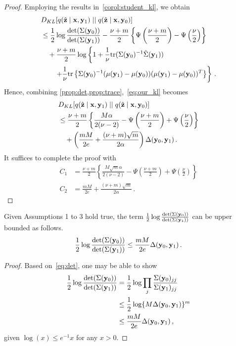 {\begin{proof}
Employing the results in~\cref{corol:student_kl}, we obtain 
\begin{align}
&D_{KL}[ q(\hat{\mathbf{z}} \mid \mathbf{x}, \mathbf{y}_1) \mid\mid q(\hat{\mathbf{z}} \mid \mathbf{x}, \mathbf{y}_0)] \notag \\
&\le \frac 1 2 \log \frac{\mathrm{det}(\Sigma(\mathbf{y}_0))}{\mathrm{det}(\Sigma(\mathbf{y}_1))} - \frac{\nu + m}{2}\left\{\Psi\left( \frac{\nu + m}{2} \right) - \Psi\left(\frac{\nu}{2} \right ) \right\} \notag \\
&\quad + \frac {\nu + m} 2 \log \left\{ 1 + \frac{1}{\nu} \mathrm{tr}(\Sigma(\mathbf{y}_0)^{-1} \tilde{\Sigma}(\mathbf{y}_1))  \right. \notag \\
&\qquad \left. + \frac{1}{\nu} \mathrm{tr}\left\{\Sigma(\mathbf{y}_0)^{-1} (\mu(\mathbf{y}_1) - \mu(\mathbf{y}_0))(\mu(\mathbf{y}_1) - \mu(\mathbf{y}_0))^T \right\} \right\} \label{eq:our_kl} \,.
\end{align}
Hence, combining \cref{prop:det,prop:trace},~\cref{eq:our_kl} becomes
\begin{align}
&D_{KL}[ q(\hat{\mathbf{z}} \mid \mathbf{x}, \mathbf{y}_1) \mid\mid q(\hat{\mathbf{z}} \mid \mathbf{x}, \mathbf{y}_0)] \notag \\
&\le \frac{\nu+m}{2} \left\{ \frac{M \alpha}{2(\nu-2)}  - \Psi\left( \frac{\nu + m}{2} \right) + \Psi\left(\frac{\nu}{2} \right) \right\} \notag \\
&\quad + \left( \frac{m M}{2e} + \frac{(\nu+m) \sqrt{m}}{2\alpha}  \right) \Delta(\mathbf{y}_0, \mathbf{y}_1) \,.
\end{align}
It suffices to complete the proof with 
\begin{align*}
C_1 &= \frac{\nu+m}{2} \left\{ \frac{M \sqrt{m} \alpha}{2(\nu-2)}  - \Psi\left( \frac{\nu + m}{2} \right) + \Psi\left(\frac{\nu}{2} \right) \right\} \\
C_2 &= \frac{m M}{2e} + \frac{(\nu+m) \sqrt{m}}{2\alpha} \,.
\end{align*} 

\end{proof}


\begin{proposition}
\label{prop:det}
Given Assumptions 1 to 3 hold true, the term $\frac 1 2 \log\frac{\mathrm{det}(\Sigma(\mathbf{y}_0))}{\mathrm{det}(\Sigma(\mathbf{y}_1))}$ can be upper bounded as follows.
\begin{align}
\frac 1 2 \log\frac{\mathrm{det}(\Sigma(\mathbf{y}_0))}{\mathrm{det}(\Sigma(\mathbf{y}_1))} \le \frac{m M }{2e} \Delta(\mathbf{y}_0, \mathbf{y}_1) \,.
\end{align}
\end{proposition}

\begin{proof} 
Based on~\cref{eq:det}, one may be able to show 
\begin{align}
\frac 1 2 \log\frac{\mathrm{det}(\Sigma(\mathbf{y}_0))}{\mathrm{det}(\Sigma(\mathbf{y}_1))}
&= \frac 1 2 \log \prod_j \frac{\Sigma(\mathbf{y}_0)_{jj}}{\Sigma(\mathbf{y}_1)_{jj}} \notag \\
&\le \frac 1 2 \log\{ M \Delta(\mathbf{y}_0, \mathbf{y}_1) \}^{m} \notag \\  
&\le \frac{m M }{2e} \Delta(\mathbf{y}_0, \mathbf{y}_1) \,, 
\end{align} 
given $\log(x) \le e^{-1} x$ for any $x>0$. 
\end{proof}
 


}
